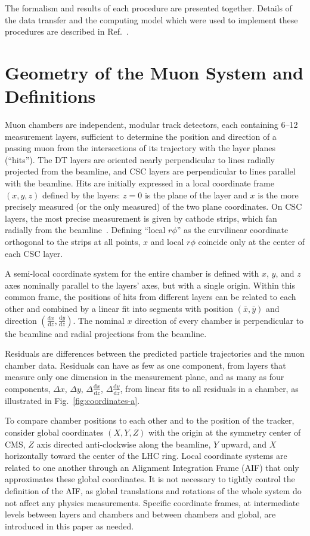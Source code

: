 \documentclass[11pt,twoside,a4paper,cmspaper]{cms-tdr}
\begin{document}
The formalism and results of each procedure are presented together.
Details of the data transfer and the computing model which were used
to implement these procedures are described in
Ref.~\cite{ref:workflow}.

\section{Geometry of the Muon System and Definitions}
\label{sec:geometry}

Muon chambers are independent, modular track detectors, each
containing 6--12 measurement layers, sufficient to determine the
position and direction of a passing muon from the intersections of its
trajectory with the layer planes (``hits'').  The DT layers are
oriented nearly perpendicular to lines radially projected from the
beamline, and CSC layers are perpendicular to lines parallel with the
beamline.  Hits are initially expressed in a local coordinate frame
$(x, y, z)$ defined by the layers: $z=0$ is the plane of the layer and
$x$ is the more precisely measured (or the only measured) of the two
plane coordinates.  On CSC layers, the most precise measurement is
given by cathode strips, which fan radially from the
beamline~\cite{ref:csc_resolution}.  Defining ``local $r\phi$'' as the
curvilinear coordinate orthogonal to the strips at all points, $x$ and
local $r\phi$ coincide only at the center of each CSC layer.

A semi-local coordinate system for the entire chamber is defined with $x$,
$y$, and $z$ axes nominally parallel to the layers' axes, but with a
single origin.  Within this common frame, the positions of
hits from different layers can be related to each other and combined
by a linear fit into segments with position $(\bar{x}, \bar{y})$
and direction $(\frac{\textrm{d}x}{\textrm{d}z}, \frac{\textrm{d}y}{\textrm{d}z})$.  The nominal $x$
direction of every chamber is perpendicular to the beamline and
radial projections from the beamline.

Residuals are differences between the predicted particle
trajectories and the muon chamber data.  Residuals can have as few as
one component, from layers that measure only one dimension in the
measurement plane, and as many as four components, $\Delta x$, $\Delta y$,
$\Delta \frac{\textrm{d}x}{\textrm{d}z}$, $\Delta \frac{\textrm{d}y}{\textrm{d}z}$, from linear fits to
all residuals in a chamber, as illustrated in
Fig.~\ref{fig:coordinates-a}.

To compare chamber positions to each other and to the position of the
tracker, consider global coordinates $(X, Y, Z)$ with the
origin at the symmetry center of CMS, $Z$ axis directed anti-clockwise along the
beamline, $Y$ upward, and $X$ horizontally toward the center
of the LHC ring.  Local coordinate systems are related to one another
through an Alignment Integration Frame (AIF) that only approximates these
global coordinates.  It is not necessary to tightly control the
definition of the AIF, as global translations
and rotations of the whole system do not affect any physics
measurements.  Specific coordinate frames, at intermediate levels
between layers and chambers and between chambers and global, are
introduced in this paper as needed.
\end{document}
